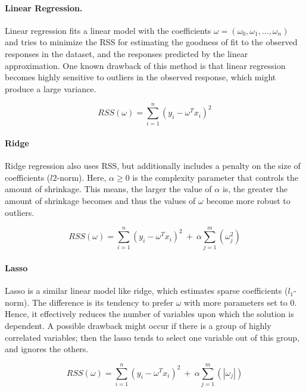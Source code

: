 \paragraph{Linear Regression.}

Linear regression fits a linear model with the coefficients $\omega = (\omega_0, \omega_1, ..., \omega_n)$ and tries to minimize the \ac{RSS} for estimating the goodness of fit to the observed responses in the dataset, and the responses predicted by the linear approximation.
One known drawback of this method is that linear regression becomes highly sensitive to outliers in the observed response, which might produce a large variance.

\begin{equation}
    \label{def:RSS:LinReg}
    RSS(\omega)=\sum_{i=1}^n(y_i-\omega^T x_i)^2
\end{equation}

\paragraph{Ridge}

Ridge regression also uses \ac{RSS}, but additionally includes a penalty on the size of coefficients ($l2$-norm). 
Here, $\alpha \geq 0$ is the complexity parameter that controls the amount of shrinkage. This means, the larger the value of $\alpha$ is, the greater the amount of shrinkage becomes and thus the values of $\omega$ become more robust to outliers.

\begin{equation}
    \label{def:RSS:Ridge}
    RSS(\omega)=\sum_{i=1}^n(y_i-\omega^T x_i)^2\ +\ \alpha\sum_{j=1}^m(\omega_j^2)
\end{equation}


\paragraph{Lasso}

Lasso is a similar linear model like ridge, which estimates sparse coefficients ($l_1$-norm). The difference is its tendency to prefer $\omega$ with more parameters set to $0$. Hence, it effectively reduces the number of variables upon which the solution is dependent. A possible drawback might occur if there is a group of highly correlated variables; then the lasso tends to select one variable out of this group, and ignores the others.

\begin{equation}
    \label{def:RSS:Lasso}
    RSS(\omega)=\sum_{i=1}^n(y_i-\omega^T x_i)^2\ +\ \alpha\sum_{j=1}^m(|\omega_j|)
\end{equation}


